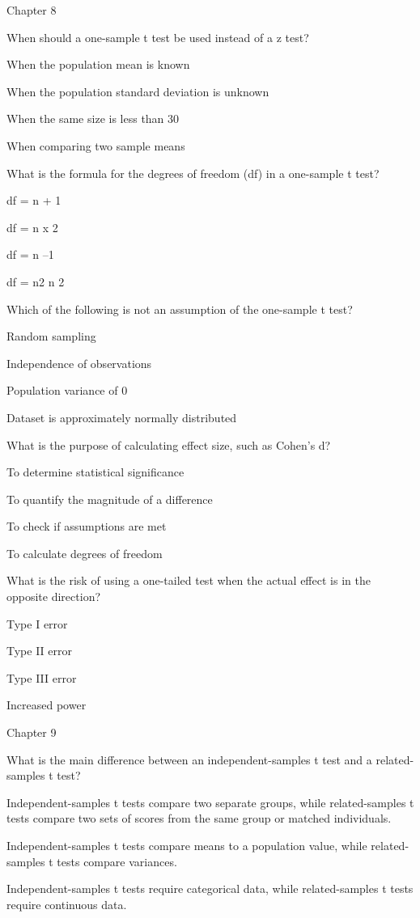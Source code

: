 \documentclass[
  letterpaper,
  DIV=11,
  numbers=noendperiod]{scrreprt}
\begin{document}
Chapter 8

When should a one-sample t test be used instead of a z test?

When the population mean is known

When the population standard deviation is unknown

When the same size is less than 30

When comparing two sample means

What is the formula for the degrees of freedom (df) in a one-sample t
test?

df = n + 1

df = n x 2

df = n --1

df = n2 n 2

Which of the following is not an assumption of the one-sample t test?

Random sampling

Independence of observations

Population variance of 0

Dataset is approximately normally distributed

What is the purpose of calculating effect size, such as Cohen's d?

To determine statistical significance

To quantify the magnitude of a difference

To check if assumptions are met

To calculate degrees of freedom

What is the risk of using a one-tailed test when the actual effect is in
the opposite direction?

Type I error

Type II error

Type III error

Increased power

Chapter 9

What is the main difference between an independent-samples t test and a
related-samples t test?

Independent-samples t tests compare two separate groups, while
related-samples t tests compare two sets of scores from the same group
or matched individuals.

Independent-samples t tests compare means to a population value, while
related-samples t tests compare variances.

Independent-samples t tests require categorical data, while
related-samples t tests require continuous data.
\end{document}
